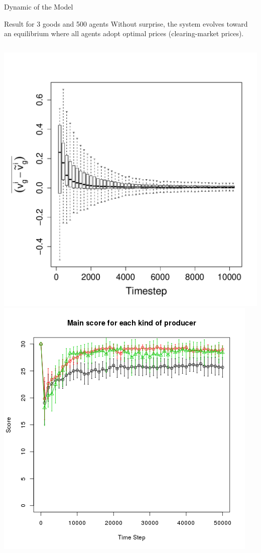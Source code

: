 \documentclass[8pt, handout=show,notes=show]{beamer}
\begin{document}
\begin{frame}{Dynamic of the Model}


	\begin{block}{Result for 3 goods and 500 agents}
		Without surprise, the system evolves toward an equilibrium where all agents adopt optimal prices (clearing-market prices). 
	\end{block}
	\begin{columns}
		\includegraphics[height=\textwidth]{images/ClearingPriceDistanceEvolutionForTrade-G3N500.pdf}
		\includegraphics[width=\textwidth]{images/scoreEx1.png}\\

\end{columns}
\end{frame}
\end{document}

